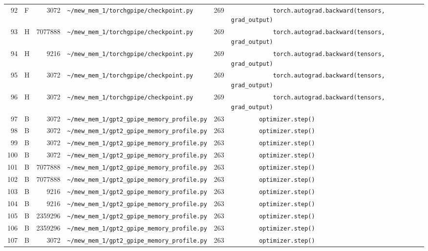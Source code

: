 \documentclass{article}
\begin{document}
\begin{longtable}{r l r p{6.5cm} r p{7.0cm}}
92 & F & 3072 & \lstinline|~/mew_mem_1/torchgpipe/checkpoint.py| & 269 & \lstinline|            torch.autograd.backward(tensors, grad_output)| \\
93 & H & 7077888 & \lstinline|~/mew_mem_1/torchgpipe/checkpoint.py| & 269 & \lstinline|            torch.autograd.backward(tensors, grad_output)| \\
94 & H & 9216 & \lstinline|~/mew_mem_1/torchgpipe/checkpoint.py| & 269 & \lstinline|            torch.autograd.backward(tensors, grad_output)| \\
95 & H & 3072 & \lstinline|~/mew_mem_1/torchgpipe/checkpoint.py| & 269 & \lstinline|            torch.autograd.backward(tensors, grad_output)| \\
96 & H & 3072 & \lstinline|~/mew_mem_1/torchgpipe/checkpoint.py| & 269 & \lstinline|            torch.autograd.backward(tensors, grad_output)| \\
97 & B & 3072 & \lstinline|~/mew_mem_1/gpt2_gpipe_memory_profile.py| & 263 & \lstinline|        optimizer.step()| \\
98 & B & 3072 & \lstinline|~/mew_mem_1/gpt2_gpipe_memory_profile.py| & 263 & \lstinline|        optimizer.step()| \\
99 & B & 3072 & \lstinline|~/mew_mem_1/gpt2_gpipe_memory_profile.py| & 263 & \lstinline|        optimizer.step()| \\
100 & B & 3072 & \lstinline|~/mew_mem_1/gpt2_gpipe_memory_profile.py| & 263 & \lstinline|        optimizer.step()| \\
101 & B & 7077888 & \lstinline|~/mew_mem_1/gpt2_gpipe_memory_profile.py| & 263 & \lstinline|        optimizer.step()| \\
102 & B & 7077888 & \lstinline|~/mew_mem_1/gpt2_gpipe_memory_profile.py| & 263 & \lstinline|        optimizer.step()| \\
103 & B & 9216 & \lstinline|~/mew_mem_1/gpt2_gpipe_memory_profile.py| & 263 & \lstinline|        optimizer.step()| \\
104 & B & 9216 & \lstinline|~/mew_mem_1/gpt2_gpipe_memory_profile.py| & 263 & \lstinline|        optimizer.step()| \\
105 & B & 2359296 & \lstinline|~/mew_mem_1/gpt2_gpipe_memory_profile.py| & 263 & \lstinline|        optimizer.step()| \\
106 & B & 2359296 & \lstinline|~/mew_mem_1/gpt2_gpipe_memory_profile.py| & 263 & \lstinline|        optimizer.step()| \\
107 & B & 3072 & \lstinline|~/mew_mem_1/gpt2_gpipe_memory_profile.py| & 263 & \lstinline|        optimizer.step()| \\

\end{longtable}
\end{document}
